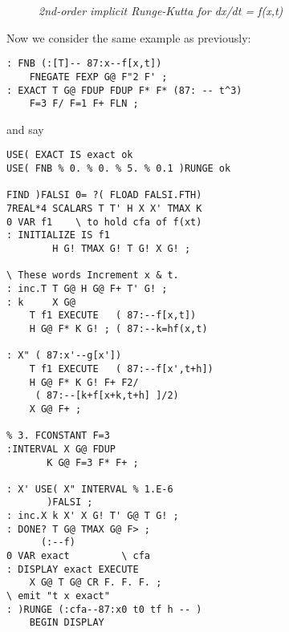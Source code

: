 \begin{figure}
    \caption{\textit{2nd-order implicit Runge-Kutta for dx/dt = f(x,t)}}
    \label{fig:06_09}
\end{figure}

Now we consider the same example as previously:

\begin{lstlisting}
: FNB (:[T]-- 87:x--f[x,t])
    FNEGATE FEXP G@ F"2 F' ;
: EXACT T G@ FDUP FDUP F* F* (87: -- t^3)
    F=3 F/ F=1 F+ FLN ;
\end{lstlisting}

and say

\begin{lstlisting}
USE( EXACT IS exact ok
USE( FNB % 0. % 0. % 5. % 0.1 )RUNGE ok

FIND )FALSI 0= ?( FLOAD FALSI.FTH)
7REAL*4 SCALARS T T' H X X' TMAX K
0 VAR f1    \ to hold cfa of f(xt)
: INITIALIZE IS f1
        H G! TMAX G! T G! X G! ;

\ These words Increment x & t.
: inc.T T G@ H G@ F+ T' G! ;
: k     X G@
    T f1 EXECUTE   ( 87:--f[x,t])
    H G@ F* K G! ; ( 87:--k=hf(x,t)

: X" ( 87:x'--g[x'])
    T f1 EXECUTE   ( 87:--f[x',t+h])
    H G@ F* K G! F+ F2/
     ( 87:--[k+f[x+k,t+h] ]/2)
    X G@ F+ ;

% 3. FCONSTANT F=3
:INTERVAL X G@ FDUP
       K G@ F=3 F* F+ ;

: X' USE( X" INTERVAL % 1.E-6
       )FALSI ;
: inc.X k X' X G! T' G@ T G! ;
: DONE? T G@ TMAX G@ F> ;
      (:--f)
0 VAR exact         \ cfa
: DISPLAY exact EXECUTE
    X G@ T G@ CR F. F. F. ;
\ emit "t x exact"
: )RUNGE (:cfa--87:x0 t0 tf h -- )
    BEGIN DISPLAY
\end{lstlisting}

